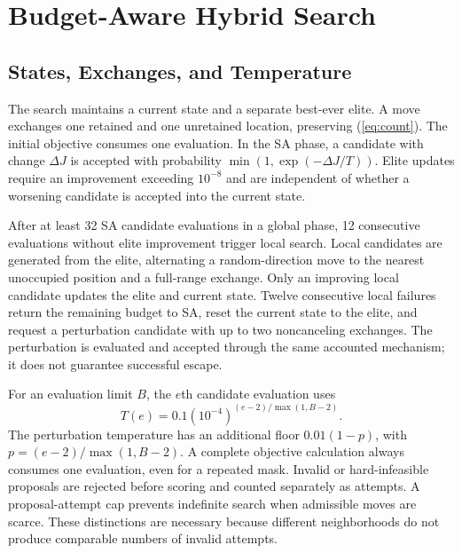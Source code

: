 \documentclass[journal]{IEEEtran}
\begin{document}
\section{Budget-Aware Hybrid Search}
\subsection{States, Exchanges, and Temperature}
The search maintains a current state and a separate best-ever elite. A move exchanges one retained and one unretained location, preserving (\ref{eq:count}). The initial objective consumes one evaluation. In the SA phase, a candidate with change $\Delta J$ is accepted with probability $\min(1,\exp(-\Delta J/T))$. Elite updates require an improvement exceeding $10^{-8}$ and are independent of whether a worsening candidate is accepted into the current state.

After at least 32 SA candidate evaluations in a global phase, 12 consecutive evaluations without elite improvement trigger local search. Local candidates are generated from the elite, alternating a random-direction move to the nearest unoccupied position and a full-range exchange. Only an improving local candidate updates the elite and current state. Twelve consecutive local failures return the remaining budget to SA, reset the current state to the elite, and request a perturbation candidate with up to two noncanceling exchanges. The perturbation is evaluated and accepted through the same accounted mechanism; it does not guarantee successful escape.

For an evaluation limit $B$, the $e$th candidate evaluation uses
\begin{equation}
T(e)=0.1(10^{-4})^{(e-2)/\max(1,B-2)}.
\end{equation}
The perturbation temperature has an additional floor $0.01(1-p)$, with $p=(e-2)/\max(1,B-2)$. A complete objective calculation always consumes one evaluation, even for a repeated mask. Invalid or hard-infeasible proposals are rejected before scoring and counted separately as attempts. A proposal-attempt cap prevents indefinite search when admissible moves are scarce. These distinctions are necessary because different neighborhoods do not produce comparable numbers of invalid attempts.
\end{document}
